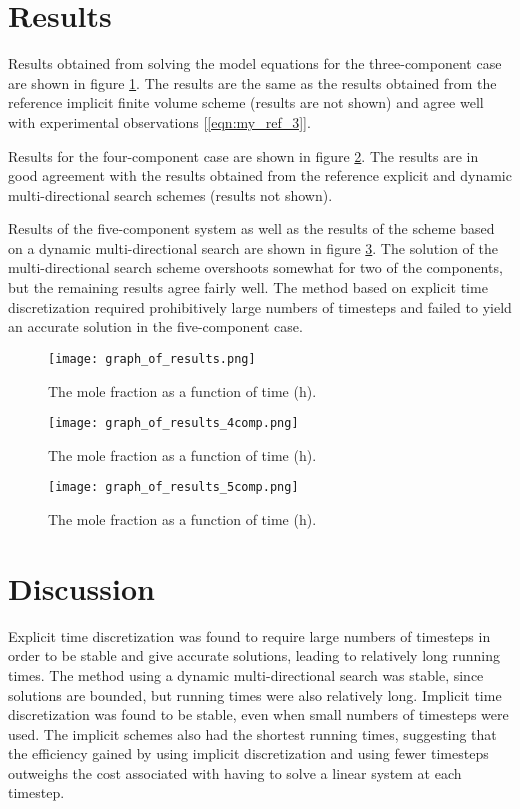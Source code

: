 \documentclass[11]{Report}
\begin{document}
\section*{Results} 
Results obtained from solving the model equations for the three-component case are shown in figure \ref{fig:fig_1}. The results are the same as the results obtained from the reference implicit finite volume scheme (results are not shown) and agree well with experimental observations [\ref{eqn:my_ref_3}]. 

Results for the four-component case are shown in figure \ref{fig:fig_2}. The results are in good agreement with the results obtained from the reference explicit and dynamic multi-directional search schemes (results not shown).

Results of the five-component system as well as the results of the scheme based on a dynamic multi-directional search are shown in figure \ref{fig:fig_3}. The solution of the multi-directional search scheme overshoots somewhat for two of the components, but the remaining results agree fairly well. The method based on explicit time discretization required prohibitively large numbers of timesteps and failed to yield an accurate solution in the five-component case.

\begin{figure}
\texttt{[image: graph\_of\_results.png]}
\caption{The mole fraction as a function of time (h).}
\label{fig:fig_1}
\end{figure}

\begin{figure}
\texttt{[image: graph\_of\_results\_4comp.png]}
\caption{The mole fraction as a function of time (h).}
\label{fig:fig_2}
\end{figure}

\begin{figure}
\texttt{[image: graph\_of\_results\_5comp.png]}
\caption{The mole fraction as a function of time (h).}
\label{fig:fig_3}
\end{figure}

\section*{Discussion}
Explicit time discretization was found to require large numbers of timesteps in order to be stable and give accurate solutions, leading to relatively long running times. The method using a dynamic multi-directional search was stable, since solutions are bounded, but running times were also relatively long. Implicit time discretization was found to be stable, even when small numbers of timesteps were used. The implicit schemes also had the shortest running times, suggesting that the efficiency gained by using implicit discretization and using fewer timesteps outweighs the cost associated with having to solve a linear system at each timestep.
\end{document}
